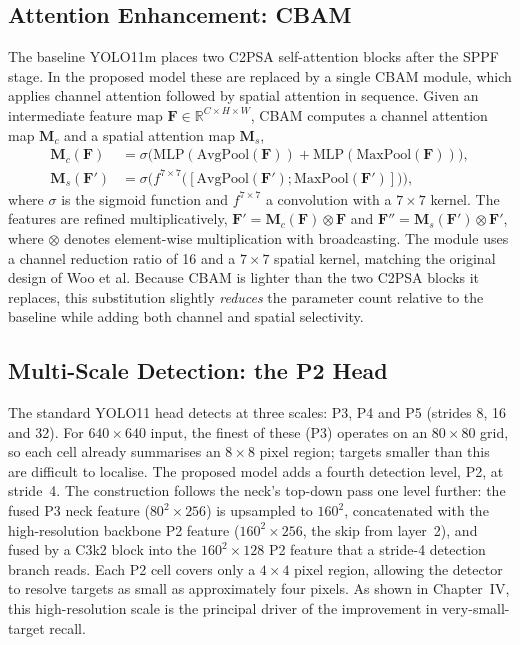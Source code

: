 \subsection{Attention Enhancement: CBAM}
\label{sec:cbam3}
The baseline YOLO11m places two C2PSA self-attention blocks after the SPPF stage.
In the proposed model these are replaced by a single CBAM module, which applies
channel attention followed by spatial attention in sequence. Given an
intermediate feature map $\mathbf{F} \in \mathbb{R}^{C \times H \times W}$, CBAM
computes a channel attention map $\mathbf{M}_c$ and a spatial attention map
$\mathbf{M}_s$,
\begin{align}
  \mathbf{M}_c(\mathbf{F}) &= \sigma\!\big(\mathrm{MLP}(\mathrm{AvgPool}(\mathbf{F}))
      + \mathrm{MLP}(\mathrm{MaxPool}(\mathbf{F}))\big), \\
  \mathbf{M}_s(\mathbf{F}') &= \sigma\!\big(f^{7\times7}\big([\mathrm{AvgPool}(\mathbf{F}');
      \mathrm{MaxPool}(\mathbf{F}')]\big)\big),
\end{align}
where $\sigma$ is the sigmoid function and $f^{7\times7}$ a convolution with a
$7\times7$ kernel. The features are refined multiplicatively,
$\mathbf{F}' = \mathbf{M}_c(\mathbf{F}) \otimes \mathbf{F}$ and
$\mathbf{F}'' = \mathbf{M}_s(\mathbf{F}') \otimes \mathbf{F}'$, where $\otimes$
denotes element-wise multiplication with broadcasting. The module uses a channel
reduction ratio of 16 and a $7\times7$ spatial kernel, matching the original
design of Woo et al. Because CBAM is lighter than the two C2PSA blocks it
replaces, this substitution slightly \emph{reduces} the parameter count relative
to the baseline while adding both channel and spatial selectivity.

\subsection{Multi-Scale Detection: the P2 Head}
The standard YOLO11 head detects at three scales: P3, P4 and P5 (strides 8, 16
and 32). For $640 \times 640$ input, the finest of these (P3) operates on an
$80 \times 80$ grid, so each cell already summarises an $8 \times 8$ pixel
region; targets smaller than this are difficult to localise. The proposed model
adds a fourth detection level, P2, at stride~4. The construction follows the
neck's top-down pass one level further: the fused P3 neck feature
($80^2 \times 256$) is upsampled to $160^2$, concatenated with the
high-resolution backbone P2 feature ($160^2 \times 256$, the skip from
layer~2), and fused by a C3k2 block into the $160^2 \times 128$ P2 feature that
a stride-4 detection branch reads. Each P2 cell covers only a $4 \times 4$ pixel
region, allowing the detector to resolve targets as small as approximately four
pixels. As shown in Chapter~IV, this high-resolution scale is the principal
driver of the improvement in very-small-target recall.


